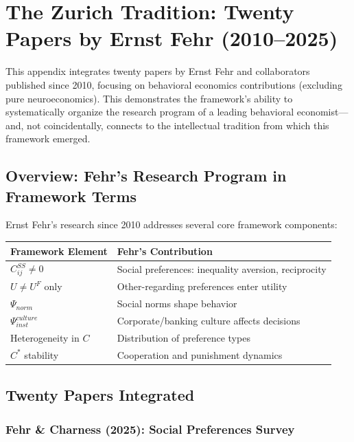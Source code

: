 \section{The Zurich Tradition: Twenty Papers by Ernst Fehr (2010--2025)}
\label{app:fehrpapers}

This appendix integrates twenty papers by Ernst Fehr and collaborators 
published since 2010, focusing on behavioral economics contributions
(excluding pure neuroeconomics). This demonstrates the framework's
ability to systematically organize the research program of a leading
behavioral economist---and, not coincidentally, connects to the
intellectual tradition from which this framework emerged.

\subsection{Overview: Fehr's Research Program in Framework Terms}

Ernst Fehr's research since 2010 addresses several core framework components:

\begin{center}
\renewcommand{\arraystretch}{1.2}
\small
\begin{tabular}{ll}
\hline
\textbf{Framework Element} & \textbf{Fehr's Contribution} \\
\hline
$C^{SS}_{ij} \neq 0$ & Social preferences: inequality aversion, reciprocity \\
$U \neq U^F$ only & Other-regarding preferences enter utility \\
$\Psi_{norm}$ & Social norms shape behavior \\
$\Psi_{inst}^{culture}$ & Corporate/banking culture affects decisions \\
Heterogeneity in $C$ & Distribution of preference types \\
$C^*$ stability & Cooperation and punishment dynamics \\
\hline
\end{tabular}
\end{center}

\subsection{Twenty Papers Integrated}

\subsubsection{Fehr \& Charness (2025): Social Preferences Survey}

